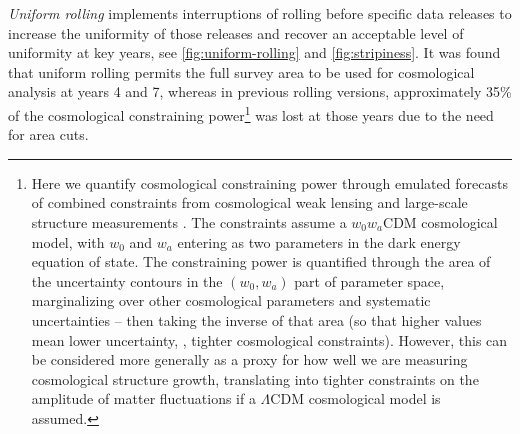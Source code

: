  {\it Uniform rolling} implements interruptions of rolling before specific data releases to increase the uniformity of those releases and recover an acceptable level of uniformity at key years, see \autoref{fig:uniform-rolling} and \autoref{fig:stripiness}.  It was found that uniform rolling permits the full survey area to be used for cosmological analysis at years 4 and 7, whereas in previous rolling versions, approximately 35\% of the cosmological constraining power\footnote{Here we quantify cosmological constraining power through emulated forecasts of combined constraints from cosmological weak lensing and large-scale structure measurements \citep{2022ApJS..259...58L}.  The constraints assume a $w_0 w_a$CDM cosmological model, with $w_0$ and $w_a$ entering as two parameters in the dark energy equation of state.  The constraining power is quantified through the area of the uncertainty contours in the $(w_0, w_a)$ part of parameter space, marginalizing over other cosmological parameters and systematic uncertainties -- then taking the inverse of that area (so that higher values mean lower uncertainty, \ie, tighter cosmological constraints).  However, this can be considered more generally as a proxy for how well we are measuring cosmological structure growth, translating into tighter constraints on the amplitude of matter fluctuations if a $\Lambda$CDM cosmological model is assumed.} was lost at those years due to the need for area cuts. 
 
